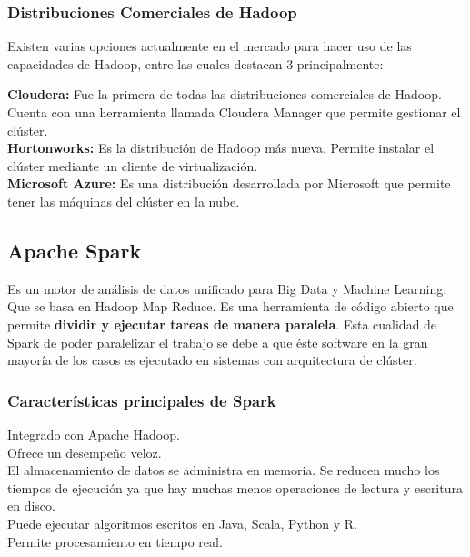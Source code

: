 \subsubsection{Distribuciones Comerciales de Hadoop}
Existen varias opciones actualmente en el mercado para hacer uso de las capacidades de Hadoop, entre las cuales destacan 3 principalmente:\\

\begin{UClist}
	\UCli \textbf{Cloudera:} Fue la primera de todas las distribuciones comerciales de Hadoop. Cuenta con una herramienta llamada Cloudera Manager que permite gestionar el clúster.\\
	\UCli \textbf{Hortonworks:} Es la distribución de Hadoop más nueva. Permite instalar el clúster mediante un cliente de virtualización.\\
	\UCli \textbf{Microsoft Azure:} Es una distribución desarrollada por Microsoft que permite tener las máquinas del clúster en la nube.\\
\end{UClist}

\subsection{Apache Spark}
Es un motor de análisis de datos unificado para Big Data y Machine Learning. Que se basa en Hadoop Map Reduce. Es una herramienta de código abierto que permite \textbf{dividir y ejecutar tareas de manera paralela}. Esta cualidad de Spark de poder paralelizar el trabajo se debe a que éste software en la gran mayoría de los casos es ejecutado en sistemas con arquitectura de clúster. \\
\newpage
\subsubsection{Características principales de Spark}
\begin{UClist}
	\UCli Integrado con Apache Hadoop.\\
	\UCli Ofrece un desempeño veloz.\\
	\UCli El almacenamiento de datos se administra en memoria. Se reducen mucho los tiempos de ejecución ya que hay muchas menos operaciones de lectura y escritura en disco.\\
	\UCli Puede ejecutar algoritmos escritos en Java, Scala, Python y R.\\
	\UCli Permite procesamiento en tiempo real.\\
\end{UClist}

